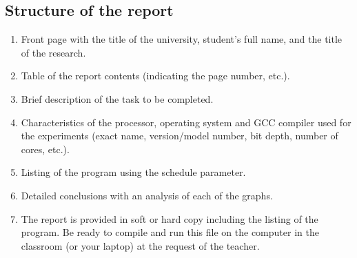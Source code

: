 { %
	\subsection{Structure of the report}
	\begin{enumerate}
		\item Front page with the title of the university, student's full name, and the title of the research.
		\item Table of the report contents (indicating the page number, etc.).
		\item Brief description of the task to be completed.
		\item Characteristics of the processor, operating system and GCC compiler used for the experiments (exact name, version/model number, bit depth, number of cores, etc.).
		\item Listing of the program using the schedule parameter.
		\item Detailed conclusions with an analysis of each of the graphs.
		\item The report is provided in soft or hard copy including the listing of the program. Be ready to compile and run this file on the computer in the classroom (or your laptop) at the request of the teacher.
	\end{enumerate}
}
